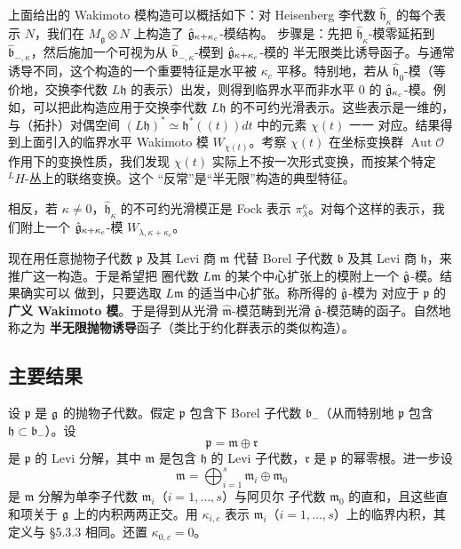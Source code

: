 上面给出的 Wakimoto 模构造可以概括如下：对 Heisenberg 李代数
$\widehat{\mathfrak h}_\kappa$ 的每个表示 $N$，我们在
$M_{\mathfrak g}\otimes N$ 上构造了 $\hat{\mathfrak{g}}_{\kappa+\kappa_c}$-模结构。
步骤是：先把 $\widehat{\mathfrak h}_\kappa$-模零延拓到
$\hat{\mathfrak b}_{-,\kappa}$，然后施加一个可视为从
$\hat{\mathfrak b}_{-,\kappa}$-模到 $\hat{\mathfrak{g}}_{\kappa+\kappa_c}$-模的
半无限类比诱导函子。与通常诱导不同，这个构造的一个重要特征是水平被
$\kappa_c$ 平移。特别地，若从 $\widehat{\mathfrak h}_0$-模（等价地，交换李代数
$L\mathfrak h$ 的表示）出发，则得到临界水平而非水平 $0$ 的
$\hat{\mathfrak{g}}_{\kappa_c}$-模。例如，可以把此构造应用于交换李代数 $L\mathfrak h$
的不可约光滑表示。这些表示是一维的，与（拓扑）对偶空间
$(L\mathfrak h)^*\simeq\mathfrak h^*(\!(t)\!)dt$ 中的元素 $\chi(t)$ 一一
对应。结果得到上面引入的临界水平 Wakimoto 模 $W_{\chi(t)}$。考察 $\chi(t)$
在坐标变换群 $\operatorname{Aut}\mathcal O$ 作用下的变换性质，我们发现
$\chi(t)$ 实际上不按一次形式变换，而按某个特定 $^LH$-丛上的联络变换。这个
“反常”是“半无限”构造的典型特征。

相反，若 $\kappa\ne0$，$\widehat{\mathfrak h}_\kappa$ 的不可约光滑模正是 Fock
表示 $\pi^\kappa_\lambda$。对每个这样的表示，我们附上一个
$\hat{\mathfrak{g}}_{\kappa+\kappa_c}$-模 $W_{\lambda,\kappa+\kappa_c}$。

现在用任意抛物子代数 $\mathfrak p$ 及其 Levi 商 $\mathfrak m$ 代替 Borel
子代数 $\mathfrak b$ 及其 Levi 商 $\mathfrak h$，来推广这一构造。于是希望把
圈代数 $L\mathfrak m$ 的某个中心扩张上的模附上一个 $\hat{\mathfrak{g}}$-模。结果确实可以
做到，只要选取 $L\mathfrak m$ 的适当中心扩张。称所得的 $\hat{\mathfrak{g}}$-模为
对应于 $\mathfrak p$ 的\textbf{广义 Wakimoto 模}。于是得到从光滑
$\widehat{\mathfrak m}$-模范畴到光滑 $\hat{\mathfrak{g}}$-模范畴的函子。自然地称之为
\textbf{半无限抛物诱导}函子（类比于约化群表示的类似构造）。

\subsection{主要结果}

设 $\mathfrak p$ 是 $\mathfrak{g}$ 的抛物子代数。假定 $\mathfrak p$ 包含下 Borel
子代数 $\mathfrak b_-$（从而特别地 $\mathfrak p$ 包含
$\mathfrak h\subset\mathfrak b_-$）。设
\begin{equation}
    \mathfrak p=\mathfrak m\oplus\mathfrak r
    \tag{6.3-1}
\end{equation}
是 $\mathfrak p$ 的 Levi 分解，其中 $\mathfrak m$ 是包含 $\mathfrak h$ 的
Levi 子代数，$\mathfrak r$ 是 $\mathfrak p$ 的幂零根。进一步设
\[
    \mathfrak m=\bigoplus_{i=1}^s\mathfrak m_i\oplus\mathfrak m_0
\]
是 $\mathfrak m$ 分解为单李子代数 $\mathfrak m_i$（$i=1,\dots,s$）与阿贝尔
子代数 $\mathfrak m_0$ 的直和，且这些直和项关于 $\mathfrak{g}$ 上的内积两两正交。用
$\kappa_{i,c}$ 表示 $\mathfrak m_i$（$i=1,\dots,s$）上的临界内积，其定义与
\S5.3.3 相同。还置 $\kappa_{0,c}=0$。

